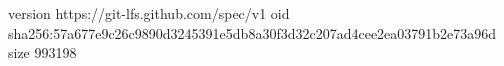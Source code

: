 version https://git-lfs.github.com/spec/v1
oid sha256:57a677e9c26c9890d3245391e5db8a30f3d32c207ad4cee2ea03791b2e73a96d
size 993198
